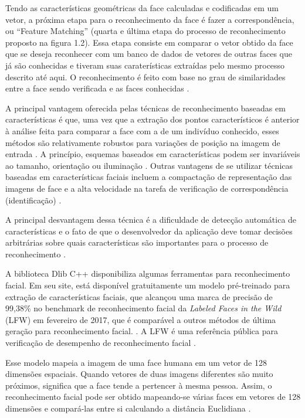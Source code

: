 Tendo as características geométricas da face calculadas e codificadas em um vetor, a próxima etapa para o reconhecimento da face é fazer a correspondência, ou “Feature Matching” (quarta e última etapa do processo de reconhecimento proposto na figura 1.2). Essa etapa consiste em comparar o vetor obtido da face que se deseja reconhecer com um banco de dados de vetores de outras faces que já são conhecidas e tiveram suas caraterísticas extraídas pelo mesmo processo descrito até aqui. O reconhecimento é feito com base no grau de similaridades entre a face sendo verificada e as faces conhecidas \cite{Quirita2014}.   

A principal vantagem oferecida pelas técnicas de reconhecimento baseadas em características é que, uma vez que a extração dos pontos característicos é anterior à análise feita para comparar a face com a de um indivíduo conhecido, esses métodos são relativamente robustos para variações de posição na imagem de entrada \cite{Jebara1996}. A princípio, esquemas baseados em características podem ser invariáveis ao tamanho, orientação ou iluminação \cite{Cox1996}. Outras vantagens de se utilizar técnicas baseadas em características faciais incluem a compactação de representação das imagens de face e a alta velocidade na tarefa de verificação de correspondência (identificação) \cite{Brunelli1992}.

A principal desvantagem dessa técnica é a dificuldade de detecção automática de características e o fato de que o desenvolvedor da aplicação deve tomar decisões arbitrárias sobre quais características são importantes para o processo de reconhecimento \cite{Cendrillon2000}.

A biblioteca Dlib C++ disponibiliza algumas ferramentas para reconhecimento facial. Em seu site, está disponível gratuitamente um modelo pré-treinado para extração de características faciais, que alcançou uma marca de precisão de 99,38\% no benchmark de reconhecimento facial da \textit{Labeled Faces in the Wild} (LFW) em fevereiro de 2017, que é comparável a outros métodos de última geração para reconhecimento facial. \cite{King2017}. A LFW é uma referência pública para verificação de desempenho de reconhecimento facial \cite{VisionLab2020}.

Esse modelo mapeia a imagem de uma face humana em um vetor de 128 dimensões espaciais. Quando vetores de duas imagens diferentes são muito próximos, significa que a face tende a pertencer à mesma pessoa. Assim, o reconhecimento facial pode ser obtido mapeando-se várias faces em vetores de 128 dimensões e compará-las entre si calculando a distância Euclidiana \cite{Anderson2021}.


